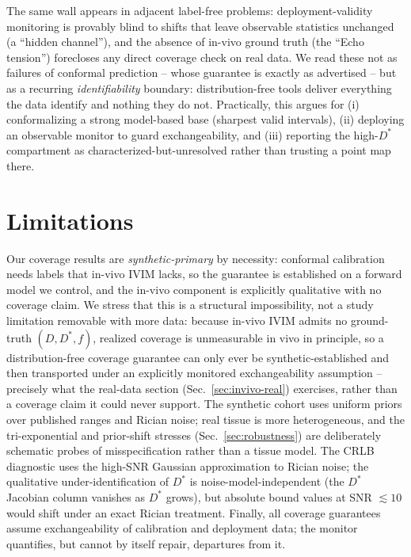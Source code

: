 \documentclass[11pt]{article}
\newcommand{\Dstar}{D^{*}}
\begin{document}
The same wall appears in adjacent label-free problems: deployment-validity
monitoring is provably blind to shifts that leave observable statistics unchanged
(a ``hidden channel''), and the absence of in-vivo ground truth (the ``Echo
tension'') forecloses any direct coverage check on real data. We read these not as
failures of conformal prediction -- whose guarantee is exactly as advertised -- but
as a recurring \emph{identifiability} boundary: distribution-free tools deliver
everything the data identify and nothing they do not. Practically, this argues for
(i) conformalizing a strong model-based base (sharpest valid intervals), (ii)
deploying an observable monitor to guard exchangeability, and (iii) reporting the
high-$\Dstar$ compartment as characterized-but-unresolved rather than trusting a
point map there.

\section{Limitations}
Our coverage results are \emph{synthetic-primary} by necessity: conformal
calibration needs labels that in-vivo IVIM lacks, so the guarantee is established
on a forward model we control, and the in-vivo component is explicitly qualitative
with no coverage claim. We stress that this is a structural impossibility, not a
study limitation removable with more data: because in-vivo IVIM admits no
ground-truth $(D,\Dstar,f)$, realized coverage is unmeasurable in vivo in
principle, so a distribution-free coverage guarantee can only ever be
synthetic-established and then transported under an explicitly monitored
exchangeability assumption -- precisely what the real-data section
(Sec.~\ref{sec:invivo-real}) exercises, rather than a coverage claim it could never
support. The synthetic cohort uses uniform priors over published
ranges and Rician noise; real tissue is more heterogeneous, and the
tri-exponential and prior-shift stresses (Sec.~\ref{sec:robustness}) are
deliberately schematic probes of misspecification rather than a tissue model. The
CRLB diagnostic uses the high-SNR Gaussian approximation to Rician noise; the
qualitative under-identification of $\Dstar$ is noise-model-independent (the
$\Dstar$ Jacobian column vanishes as $\Dstar$ grows), but absolute bound values at
SNR $\lesssim10$ would shift under an exact Rician treatment. Finally, all coverage
guarantees assume exchangeability of calibration and deployment data; the monitor
quantifies, but cannot by itself repair, departures from it.
\end{document}
